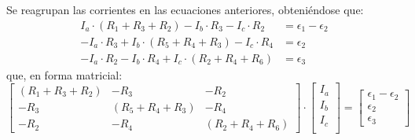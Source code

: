 \begin{example}
\begin{enumerate}
			Se reagrupan las corrientes en las ecuaciones anteriores, obteniéndose que: 
			\begin{align*}
				I_a \cdot (R_1 + R_3 + R_2)  - I_b\cdot R_3 - I_c \cdot R_2 &= \epsilon_1 - \epsilon_2\\
				- I_a \cdot R_3 + I_b \cdot (R_5 + R_4 + R_3) - I_c \cdot R_4 &=  \epsilon_2\\
				- I_a \cdot R_2 - I_b \cdot R_4 + I_c \cdot (R_2 + R_4 + R_6) &= \epsilon_3
			\end{align*}
			que, en forma matricial: 
			\begin{equation*}
				\begin{bmatrix}
					(R_1 + R_3 + R_2) &  - R_3 & - R_2 \\
					- R_3 & (R_5 + R_4 + R_3) & - R_4 \\
					- R_2 & - R_4 &  (R_2 + R_4 + R_6)
				\end{bmatrix} \cdot %
				\begin{bmatrix}
					I_a\\
					I_b\\
					I_c\\
				\end{bmatrix} = %
				\begin{bmatrix}
					\epsilon_1 - \epsilon_2\\
					\epsilon_2\\
					\epsilon_3
				\end{bmatrix}
			\end{equation*}
		\end{enumerate}
	\end{example}
	
